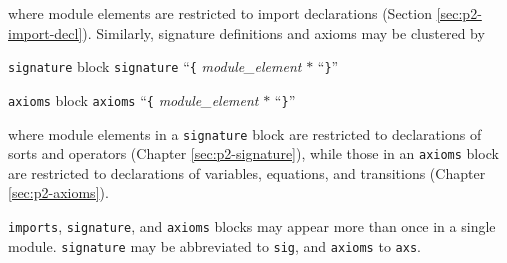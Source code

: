 \documentclass[a4paper]{memoir}
\begin{document}
where module elements are restricted to import declarations
(Section \ref{sec:p2-import-decl}). Similarly, signature definitions
and axioms may be clustered by

\begin{bsyntax} \texttt{signature} block  \Hline
\texttt{signature} ``\texttt{\{} \textit{module\_element} $*$ ``\texttt{\}}''
\end{bsyntax}

\begin{bsyntax} \texttt{axioms} block  \Hline
\texttt{axioms} ``\texttt{\{} \textit{module\_element} $*$ ``\texttt{\}}''
\end{bsyntax}

where module elements in a \verb|signature| block
are restricted to declarations of sorts and operators (Chapter \ref{sec:p2-signature}),
while those in an \verb|axioms| block are restricted
to declarations of variables, equations, and transitions
(Chapter \ref{sec:p2-axioms}).

\verb|imports|,
\verb|signature|, and \verb|axioms| blocks may appear more than once in a
single module. \verb|signature| may be abbreviated to \verb|sig|, and
\verb|axioms| to \verb|axs|.
\end{document}
